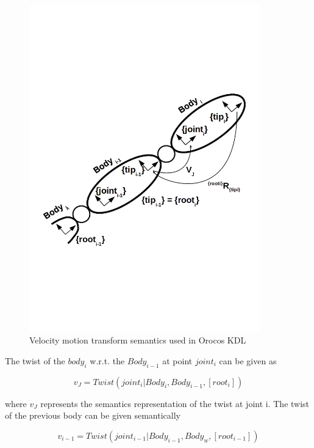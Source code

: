 \begin{figure}[h]
\centering
\includegraphics[width=100mm, trim=0 250 0 250]{pictures/kdl_rigidbody_semantics}
\caption{Velocity motion transform semantics used in Orocos KDL}
\end{figure}

The twist of the $body_i$ w.r.t. the $Body_{i-1}$ at point $joint_i$ can be given as

\begin{equation}
v_J = Twist(joint_i|Body_i, Body_{i-1}, [root_i])
\label{eq:twistofthecurrentbody}
\end{equation}

where $v_J$ represents the semantics representation of the twist at joint i. The twist of the previous body can be given semantically 

\begin{equation}
v_{i-1} = Twist(joint_{i-1}|Body_{i-1}, Body_w, [root_{i-1}])
\label{eq:twistofthepreviousbody}
\end{equation}

